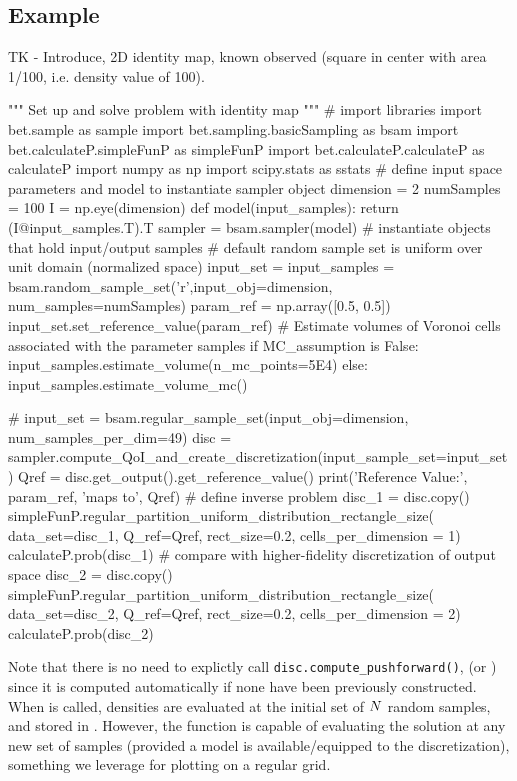 \subsection{Example}\label{sec:set-example}

TK - Introduce, 2D identity map, known observed (square in center with area 1/100, i.e. density value of 100).

\begin{python}
"""
Set up and solve problem with identity map
"""
# import libraries
import bet.sample as sample
import bet.sampling.basicSampling as bsam
import bet.calculateP.simpleFunP as simpleFunP
import bet.calculateP.calculateP as calculateP
import numpy as np
import scipy.stats as sstats
# define input space parameters and model to instantiate sampler object
dimension = 2
numSamples = 100
I = np.eye(dimension)
def model(input_samples):
        return (I@input_samples.T).T
sampler = bsam.sampler(model)
# instantiate objects that hold input/output samples
# default random sample set is uniform over unit domain (normalized space)
input_set = input_samples = bsam.random_sample_set('r',input_obj=dimension, num_samples=numSamples)
param_ref = np.array([0.5, 0.5])
input_set.set_reference_value(param_ref)
# Estimate volumes of Voronoi cells associated with the parameter samples
if MC_assumption is False:
    input_samples.estimate_volume(n_mc_points=5E4)
else:
    input_samples.estimate_volume_mc()

# input_set = bsam.regular_sample_set(input_obj=dimension, num_samples_per_dim=49)
disc = sampler.compute_QoI_and_create_discretization(input_sample_set=input_set)
Qref = disc.get_output().get_reference_value()
print('Reference Value:', param_ref, 'maps to', Qref)
# define inverse problem
disc_1 = disc.copy()
simpleFunP.regular_partition_uniform_distribution_rectangle_size(
        data_set=disc_1, Q_ref=Qref, rect_size=0.2,
        cells_per_dimension = 1)
calculateP.prob(disc_1)
# compare with higher-fidelity discretization of output space
disc_2 = disc.copy()
simpleFunP.regular_partition_uniform_distribution_rectangle_size(
        data_set=disc_2, Q_ref=Qref, rect_size=0.2,
        cells_per_dimension = 2)
calculateP.prob(disc_2)
\end{python}

Note that there is no need to explictly call {\tt disc.compute\_pushforward()}, (or ) since it is computed automatically if none have been previously constructed.
When  is called, densities are evaluated at the initial set of $N$ random samples, and stored in .
However, the function  is capable of evaluating the solution at any new set of samples (provided a model is available/equipped to the discretization), something we leverage for plotting on a regular grid.

